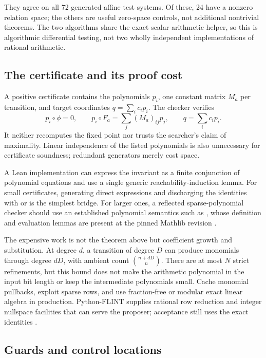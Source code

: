 They agree on all 72 generated affine test systems. Of these, 24 have a nonzero
relation space; the others are useful zero-space controls, not additional
nontrivial theorems. The two algorithms share the exact scalar-arithmetic helper,
so this is algorithmic differential testing, not two wholly independent
implementations of rational arithmetic.

\subsection{The certificate and its proof cost}

A positive certificate contains the polynomials $p_i$, one constant matrix
$M_a$ per transition, and target coordinates $q=\sum_i c_i p_i$. The checker
verifies
\begin{equation}\label{eq:space-certificate}
 p_i\circ\phi=0,\qquad
 p_i\circ F_a=\sum_j (M_a)_{ij}p_j,\qquad
 q=\sum_i c_i p_i.
\end{equation}
It neither recomputes the fixed point nor trusts the searcher's claim of
maximality. Linear independence of the listed polynomials is also unnecessary
for certificate soundness; redundant generators merely cost space.

A Lean implementation can express the invariant as a finite conjunction of
polynomial equations and use a single generic reachability-induction lemma.
For small certificates, generating direct expressions and discharging the
identities with  or  is the simplest bridge. For larger
ones, a reflected sparse-polynomial checker should use an established polynomial
semantics such as , whose definition and evaluation
lemmas are present at the pinned Mathlib revision \cite{mathlib-eval}.

The expensive work is not the theorem above but coefficient growth and
substitution. At degree $d$, a transition of degree $D$ can produce monomials
through degree $dD$, with ambient count $\binom{n+dD}{n}$. There are at most
$N$ strict refinements, but this bound does not make the arithmetic polynomial
in the input bit length or keep the intermediate polynomials small. Cache
monomial pullbacks, exploit sparse rows, and use fraction-free or modular exact
linear algebra in production. Python-FLINT supplies rational row reduction and
integer nullspace facilities that can serve the proposer; acceptance still
uses the exact identities \cite{flint-q,flint-z}.

\subsection{Guards and control locations}

